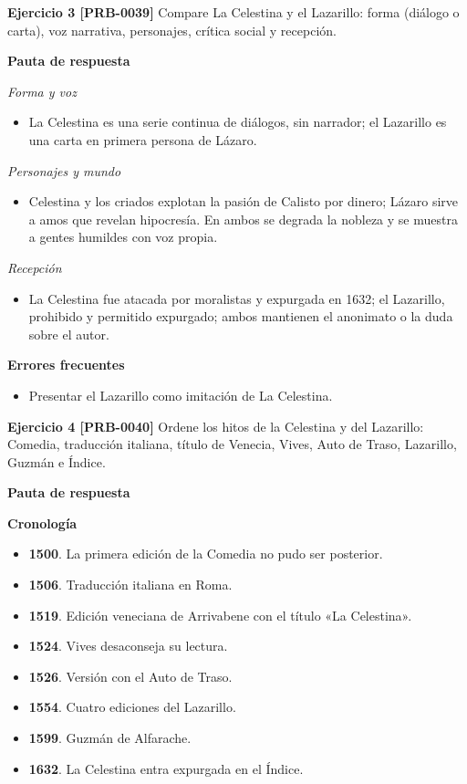 \documentclass{book}
\begin{document}
\noindent\textbf{Ejercicio 3 [PRB-0039]}
Compare La Celestina y el Lazarillo: forma (diálogo o carta), voz narrativa, personajes, crítica social y recepción.


\noindent\textbf{Pauta de respuesta}

\noindent\textit{Forma y voz}
\begin{itemize}
\item La Celestina es una serie continua de diálogos, sin narrador; el Lazarillo es una carta en primera persona de Lázaro.
\end{itemize}

\noindent\textit{Personajes y mundo}
\begin{itemize}
\item Celestina y los criados explotan la pasión de Calisto por dinero; Lázaro sirve a amos que revelan hipocresía. En ambos se degrada la nobleza y se muestra a gentes humildes con voz propia.
\end{itemize}

\noindent\textit{Recepción}
\begin{itemize}
\item La Celestina fue atacada por moralistas y expurgada en 1632; el Lazarillo, prohibido y permitido expurgado; ambos mantienen el anonimato o la duda sobre el autor.
\end{itemize}

\noindent\textbf{Errores frecuentes}
\begin{itemize}
\item Presentar el Lazarillo como imitación de La Celestina.
\end{itemize}

\noindent\textbf{Ejercicio 4 [PRB-0040]}
Ordene los hitos de la Celestina y del Lazarillo: Comedia, traducción italiana, título de Venecia, Vives, Auto de Traso, Lazarillo, Guzmán e Índice.


\noindent\textbf{Pauta de respuesta}

\noindent\textbf{Cronología}
\begin{itemize}
\item \textbf{1500}. La primera edición de la Comedia no pudo ser posterior.
\item \textbf{1506}. Traducción italiana en Roma.
\item \textbf{1519}. Edición veneciana de Arrivabene con el título «La Celestina».
\item \textbf{1524}. Vives desaconseja su lectura.
\item \textbf{1526}. Versión con el Auto de Traso.
\item \textbf{1554}. Cuatro ediciones del Lazarillo.
\item \textbf{1599}. Guzmán de Alfarache.
\item \textbf{1632}. La Celestina entra expurgada en el Índice.
\end{itemize}
\end{document}
